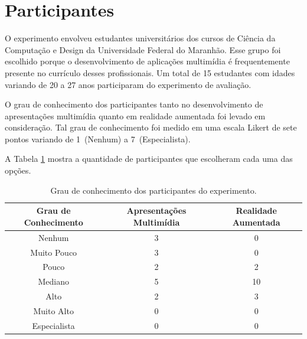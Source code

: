 \documentclass[../main.tex]{subfiles}
\begin{document}
\section{Participantes}
\label{sec:participantes}

O experimento envolveu estudantes universitários dos cursos de Ciência da Computação e Design da Universidade Federal do Maranhão. Esse grupo foi escolhido porque o desenvolvimento de aplicações multimídia é frequentemente presente no currículo desses profissionais. Um total de 15 estudantes com idades variando de 20 a 27 anos participaram do experimento de avaliação.

O grau de conhecimento dos participantes tanto no desenvolvimento de apresentações multimídia quanto em realidade aumentada foi levado em consideração. Tal grau de conhecimento foi medido em uma escala Likert de sete pontos variando de 1~(Nenhum) a 7~(Especialista).

A Tabela \ref{tab:expParticipantes} mostra a quantidade de participantes que escolheram cada uma das opções.

\begin{table}[ht!]
\caption{Grau de conhecimento dos participantes do experimento.}
\label{tab:expParticipantes}

\begin{tabular}{@{}ccc@{}}
\toprule
\textbf{Grau de Conhecimento} & \textbf{Apresentações Multimídia} & \textbf{Realidade Aumentada} \\ \midrule
Nenhum                        & 3                                 & 0                            \\
Muito Pouco                   & 3                                 & 0                            \\
Pouco                         & 2                                 & 2                            \\
Mediano                       & 5                                 & 10                           \\
Alto                          & 2                                 & 3                            \\
Muito Alto                    & 0                                 & 0                            \\
Especialista                  & 0                                 & 0                            \\ \bottomrule
\end{tabular}
\end{table}
\end{document}
